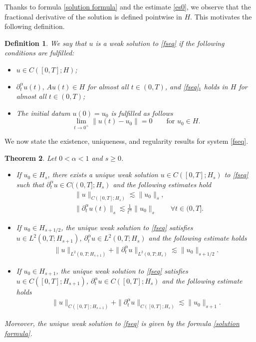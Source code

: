 \documentclass[reqno]{amsart}
\newtheorem{theorem}{Theorem}[section]
\newtheorem{defn}[theorem]{Definition}
\numberwithin{equation}{section}
\begin{document}
Thanks to formula \eqref{solution formula} and the estimate \eqref{es0}, we observe that the fractional derivative of the solution is defined pointwise in $H$. This motivates the following definition.
\begin{defn} \label{solution_def1}
	We say that $u$ is a weak solution to \eqref{fseq} if the following conditions are fulfilled:
	\begin{itemize}
		\item[(i)] $u\in C([0,T];H)$;
		\item[(ii)] $\partial_{t}^{\alpha}u(t),\, Au(t)\in H$ for almost all $t\in (0,T)$, and \eqref{fseq}$_1$ holds in $H$ for almost all $t\in (0,T)$;
		\item[(iii)] The initial datum $u(0)=u_0$ is fulfilled as follows
		$$\lim_{t\to 0^{+}}\|u(t)-u_0\|=0 \qquad \text{for } u_0\in H.$$
	\end{itemize}
\end{defn} 
We now state the existence, uniqueness, and regularity results for system \eqref{fseq}.
\begin{theorem} \label{Thm_well1}
	Let $0<\alpha < 1$ and $s\geq 0$.
	\begin{itemize}
		\item[(i)] If $u_0\in H_s$, there exists a unique weak solution $u \in C([0, T] ; H_s)$ to \eqref{fseq} such that $\partial_t^\alpha u\in C((0, T] ; H_s)$ and the following estimates hold
	\begin{align}
		&\|u\|_{C([0,T];H_s)}\lesssim \|u_0\|_s, \label{estime1}\\ 
		&\|\partial^{\alpha}_tu(t)\|_s\lesssim \frac{1}{t^{\alpha}}\|u_{0}\|_s \qquad \forall t\in (0,T]. \label{estime2}
	\end{align}
    \item[(ii)] If $u_0\in H_{s+1/2}$, the unique weak solution to \eqref{fseq} satisfies $u \in L^2(0,T; H_{s+1})$, $\partial_t^\alpha u \in L^2(0,T; H_s)$ and the following estimate holds
    \begin{align*}
    	\|u\|_{L^2(0,T; H_{s+1})}+ \|\partial_t^\alpha u\|_{L^2(0,T; H_s)}\lesssim \|u_0\|_{s+1/2}. 
    \end{align*}
	\item[(iii)] If $u_0\in H_{s+1}$, the unique weak solution to \eqref{fseq} satisfies $u \in C([0, T] ; H_{s+1})$, $\partial_t^\alpha u \in C([0, T] ; H_s)$ and the following estimate holds
	\begin{align*}
		\|u\|_{C([0,T];H_{s+1})}+ \|\partial_t^\alpha u\|_{C([0,T];H_s)}\lesssim \|u_0\|_{s+1}.
	\end{align*}
\end{itemize}
	Moreover, the unique weak solution to \eqref{fseq} is given by the formula \eqref{solution formula}.
\end{theorem}
\end{document}

